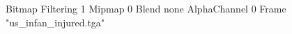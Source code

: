 {Bitmap
	{Filtering 1}
	{Mipmap 0}
	{Blend none}
	{AlphaChannel 0}
	{Frame "us_infan_injured.tga"}
}
